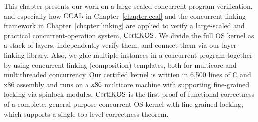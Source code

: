 



This chapter presents our work on a large-scaled concurrent program verification, and
especially 
how $\mathrm{CCAL}$ in Chapter~\ref{chapter:ccal} and the concurrent-linking framework in Chapter~\ref{chapter:linking} are applied 
to verify a large-scaled and practical concurrent-operation system, $\mathrm{CertiKOS}$.
We divide the full OS kernel as a stack of layers, independently verify them, 
and connect them via our layer-linking library. 
Also,
we glue multiple instances in a concurrent program together by using concurrent-linking (composition) templates, both for multicore and multithreaded concurrency. 
Our certified kernel is written in 6,500 lines of C and x86 assembly
and runs on a $\mathrm{x86}$ multicore machine with supporting fine-grained locking via spinlock modules.
$\mathrm{CertiKOS}$ is the first proof of functional correctness of a complete,
general-purpose concurrent OS kernel with fine-grained locking,
which supports a single top-level correctness theorem. 


